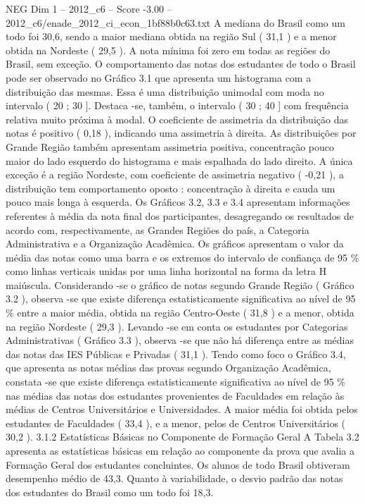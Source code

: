 \begin{textsample}{NEG Dim 1 – 2012\_c6 – Score -3.00 – 2012\_c6/enade\_2012\_ci\_econ\_1bf88b0c63.txt}
A mediana do Brasil como um todo foi 30,6, sendo a maior mediana obtida na região Sul ( 31,1 ) e a menor obtida na Nordeste ( 29,5 ).
A nota mínima foi zero em todas as regiões do Brasil, sem exceção.
O comportamento das notas dos estudantes de todo o Brasil pode ser observado no Gráfico 3.1 que apresenta um histograma com a distribuição das mesmas.
Essa é uma distribuição unimodal com moda no intervalo ( 20 ; 30 ].
Destaca -se, também, o intervalo ( 30 ; 40 ] com frequência relativa muito próxima à modal.
O coeficiente de assimetria da distribuição das notas é positivo ( 0,18 ), indicando uma assimetria à direita.
As distribuições por Grande Região também apresentam assimetria positiva, concentração pouco maior do lado esquerdo do histograma e mais espalhada do lado direito.
A única exceção é a região Nordeste, com coeficiente de assimetria negativo ( -0,21 ), a distribuição tem comportamento oposto : concentração à direita e cauda um pouco mais longa à esquerda.
Os Gráficos 3.2, 3.3 e 3.4 apresentam informações referentes à média da nota final dos participantes, desagregando os resultados de acordo com, respectivamente, as Grandes Regiões do país, a Categoria Administrativa e a Organização Acadêmica.
Os gráficos apresentam o valor da média das notas como uma barra e os extremos do intervalo de confiança de 95 \% como linhas verticais unidas por uma linha horizontal na forma da letra H maiúscula.
Considerando -se o gráfico de notas segundo Grande Região ( Gráfico 3.2 ), observa -se que existe diferença estatisticamente significativa ao nível de 95 \% entre a maior média, obtida na região Centro-Oeste ( 31,8 ) e a menor, obtida na região Nordeste ( 29,3 ).
Levando -se em conta os estudantes por Categorias Administrativas ( Gráfico 3.3 ), observa -se que não há diferença entre as médias das notas das IES Públicas e Privadas ( 31,1 ).
Tendo como foco o Gráfico 3.4, que apresenta as notas médias das provas segundo Organização Acadêmica, constata -se que existe diferença estatisticamente significativa ao nível de 95 \% nas médias das notas dos estudantes provenientes de Faculdades em relação às médias de Centros Universitários e Universidades.
A maior média foi obtida pelos estudantes de Faculdades ( 33,4 ), e a menor, pelos de Centros Universitários ( 30,2 ). 3.1.2 Estatísticas Básicas no Componente de Formação Geral A Tabela 3.2 apresenta as estatísticas básicas em relação ao componente da prova que avalia a Formação Geral dos estudantes concluintes.
Os alunos de todo Brasil obtiveram desempenho médio de 43,3.
Quanto à variabilidade, o desvio padrão das notas dos estudantes do Brasil como um todo foi 18,3.

\end{textsample}
